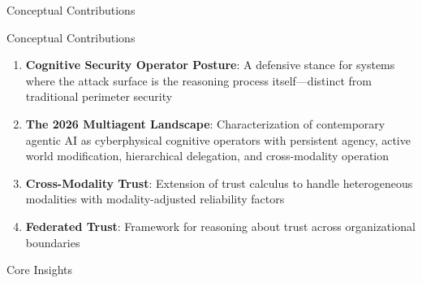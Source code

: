 \documentclass[
  ignorenonframetext,
]{beamer}
\begin{document}
\begin{frame}[allowframebreaks]{Conceptual Contributions}
\protect{}\label{conceptual-contributions}
\end{frame}

\begin{frame}[allowframebreaks]{Conceptual Contributions}
\begin{enumerate}
\item \textbf{Cognitive Security Operator Posture}: A defensive stance for systems where the attack surface is the reasoning process itself---distinct from traditional perimeter security
\item \textbf{The 2026 Multiagent Landscape}: Characterization of contemporary agentic AI as cyberphysical cognitive operators with persistent agency, active world modification, hierarchical delegation, and cross-modality operation
\item \textbf{Cross-Modality Trust}: Extension of trust calculus to handle heterogeneous modalities with modality-adjusted reliability factors
\item \textbf{Federated Trust}: Framework for reasoning about trust across organizational boundaries
\end{enumerate}
\end{frame}

\begin{frame}[allowframebreaks]{Core Insights}
\protect{}\label{core-insights}
\end{frame}
\end{document}
